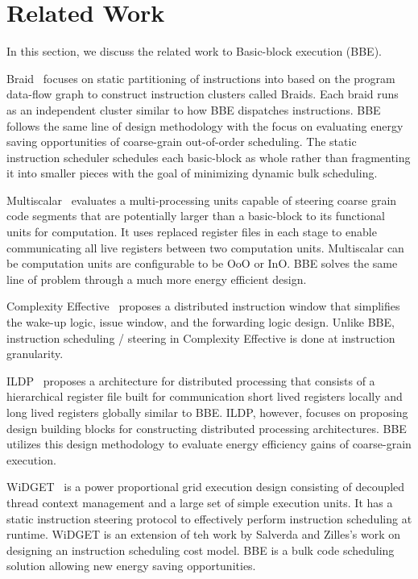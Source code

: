 \section{Related Work}
\label{sec:rel_work}
In this section, we discuss the related work to Basic-block execution (BBE).

Braid~\cite{braid} focuses on static partitioning of instructions into based on
the program data-flow graph to construct instruction clusters called Braids.
Each braid runs as an independent cluster similar to how BBE dispatches
instructions. BBE follows the same line of design methodology with the focus on
evaluating energy saving opportunities of coarse-grain out-of-order scheduling.
The static instruction scheduler schedules each basic-block as whole rather than
fragmenting it into smaller pieces with the goal of minimizing dynamic bulk
scheduling.

Multiscalar~\cite{multiscalar} evaluates a multi-processing units capable of
steering coarse grain code segments that are potentially larger than a
basic-block to its functional units for computation. It uses replaced register
files in each stage to enable communicating all live registers between two
computation units. Multiscalar can be computation units are configurable to be
OoO or InO. BBE solves the same line of problem through a much more energy
efficient design.

Complexity Effective~\cite{complexity} proposes a distributed instruction
window that simplifies the wake-up logic, issue window, and the forwarding logic
design. Unlike BBE, instruction scheduling / steering in Complexity Effective is
done at instruction granularity.

ILDP~\cite{ildp} proposes a architecture for distributed processing that
consists of a hierarchical register file built for communication short lived
registers locally and long lived registers globally similar to BBE. ILDP,
          however, focuses on proposing design building blocks for
          constructing distributed processing architectures. BBE utilizes this
          design methodology to evaluate energy efficiency gains of coarse-grain
          execution.

WiDGET~\cite{widget} is a power proportional grid execution design consisting of
decoupled thread context management and a large set of simple execution units.
It has a static instruction steering protocol to effectively perform instruction
scheduling at runtime.  WiDGET is an extension of teh work by Salverda and
Zilles's\cite{fundamental} work on designing an instruction scheduling cost
model. BBE is a bulk code scheduling solution allowing new energy saving
opportunities.


